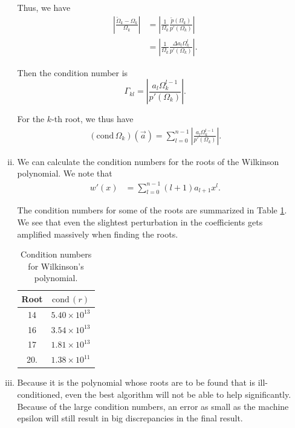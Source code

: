 \documentclass[12pt]{article}
\begin{document}
\begin{enumerate}[(a)]
\begin{enumerate}[(i)]
	Thus, we have
	\begin{equation*}
	\begin{aligned}
	\left|\frac{\widetilde{\Omega}_k - \Omega_k}{\Omega_k}\right| &= 
	\left|\frac{1}{\Omega_k} \frac{\widetilde{p}(\Omega_k)}{p'(\Omega_k)}\right| \\
	&= \left|\frac{1}{\Omega_k} \frac{\Delta a_l \Omega_k^l}{p'(\Omega_k)}\right|.
	\end{aligned}
	\end{equation*}

	Then the condition number is
	\begin{equation*}
	\Gamma_{kl} = \left|\frac{a_l \Omega_k^{l-1}}{p'(\Omega_k)}\right|.
	\end{equation*}

	For the $k$-th root, we thus have
	\begin{equation*}
	\begin{aligned}
	(\mathrm{cond}\,\Omega_k)(\vec{a}) = \sum_{l=0}^{n-1}\left|\frac{a_l \Omega_k^{l-1}}{p'(\Omega_k)}\right|.
	\end{aligned}
	\end{equation*}

	\item
	We can calculate the condition numbers for the roots of the Wilkinson polynomial. We note that 
	\begin{equation*}
	\begin{aligned}
	w'(x) &= \sum_{l=0}^{n-1} (l+1) a_{l+1} x^l.
	\end{aligned}
	\end{equation*}

	The condition numbers for some of the roots are summarized in Table \ref{tab:wilkinson_condition}. We see that even the slightest perturbation in the coefficients gets amplified massively when finding the roots.


	\begin{table}[h!]
	\centering
	\begin{tabular}{c|c}
	Root & $\mathrm{cond}\,(r)$ \\
	\hline
	14	& $5.40\times10^{13}$ \\
	16  & $3.54\times10^{13}$ \\
	17  & $1.81\times10^{13}$ \\
	20. & $1.38\times10^{11}$ \\
	
	\end{tabular}
	\caption{Condition numbers for Wilkinson's polynomial. \label{tab:wilkinson_condition}}
	\end{table}

	\item 
	Because it is the polynomial whose roots are to be found that is ill-conditioned, even the best algorithm will not be able to help significantly. Because of the large condition numbers, an error as small as the machine epsilon will still result in big discrepancies in the final result.

	\end{enumerate}

\end{enumerate}
\end{document}
